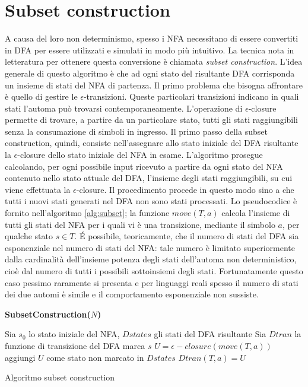 \section{Subset construction} \label{subset}
A causa del loro non determinismo, spesso i NFA necessitano di essere convertiti in DFA per essere utilizzati e simulati in modo più intuitivo. La tecnica nota in letteratura per ottenere questa conversione è chiamata \emph{subset construction}.
L'idea generale di questo algoritmo è che ad ogni stato del risultante DFA corrisponda un insieme di stati del NFA di partenza.
Il primo problema che bisogna affrontare è quello di gestire le $\epsilon$-transizioni. Queste particolari transizioni indicano in quali stati l'automa può trovarsi contemporaneamente. L'operazione di $\epsilon$-closure permette di trovare, a partire da un particolare stato, tutti gli stati raggiungibili senza la consumazione di simboli in ingresso. Il primo passo della subset construction, quindi, consiste nell'assegnare allo stato iniziale del DFA risultante la $\epsilon$-closure dello stato iniziale del NFA in esame. L'algoritmo prosegue calcolando, per ogni possibile input ricevuto a partire da ogni stato del NFA contenuto nello  stato attuale del DFA, l'insieme degli stati raggiungibili, su cui viene effettuata la $\epsilon$-closure. Il procedimento procede in questo modo sino a che tutti i nuovi stati generati nel DFA non sono stati processati. Lo pseudocodice è fornito nell'algoritmo \ref{alg:subset}; la funzione $move(T,a)$ calcola l'insieme di tutti gli stati del NFA per i quali vi è una transizione, mediante il simbolo $a$, per qualche stato $s \in T$.
\'E possibile, teoricamente, che il numero di stati del DFA sia esponenziale nel numero di stati del NFA: tale numero è limitato superiormente dalla cardinalità dell'insieme potenza degli stati dell'automa non deterministico, cioè dal numero di tutti i possibili sottoinsiemi degli stati.
Fortunatamente questo caso pessimo raramente si presenta e per linguaggi reali spesso il numero di stati dei due automi è simile e il comportamento esponenziale non sussiste.

\begin{algorithm}
\textbf{SubsetConstruction($N$)}
\begin{algorithmic}
\STATE Sia $s_0$ lo stato iniziale del NFA, $Dstates$ gli stati del DFA risultante
\STATE Sia $Dtran$ la funzione di transizione del DFA
	\STATE marca $s$
		\STATE $U = \epsilon-closure(move(T,a))$
			\STATE aggiungi $U$ come stato non marcato in $Dstates$
		\ENDIF
		\STATE $Dtran(T,a) = U$
	\ENDFOR
\ENDWHILE
\end{algorithmic}
\caption{Algoritmo subset construction}
\label{alg:subset}
\end{algorithm}

